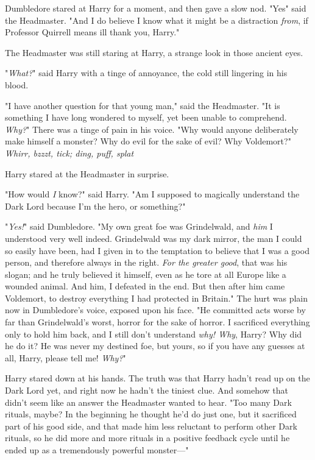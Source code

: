 Dumbledore stared at Harry for a moment, and then gave a slow nod.
"Yes{\el}" said the Headmaster. "And I do believe I know what it might be a
distraction \emph{from}, if Professor Quirrell means ill{\el} thank you,
Harry."

The Headmaster was still staring at Harry, a strange look in those ancient eyes.

"\emph{What?}" said Harry with a tinge of annoyance, the cold still lingering
in his blood.

"I have another question for that young man," said the Headmaster. "It is
something I have long wondered to myself, yet been unable to comprehend.
\emph{Why?}" There was a tinge of pain in his voice. "Why would anyone
deliberately make himself a monster? Why do evil for the sake of evil? Why
Voldemort?"
\sbreak
\emph{Whirr, bzzzt, tick; ding, puff, splat{\el}}

Harry stared at the Headmaster in surprise.

"How would \emph{I} know?" said Harry. "Am I supposed to magically understand
the Dark Lord because I'm the hero, or something?"

"\emph{Yes!}" said Dumbledore. "My own great foe was Grindelwald, and
\emph{him} I understood very well indeed. Grindelwald was my dark mirror, the
man I could so easily have been, had I given in to the temptation to believe
that I was a good person, and therefore always in the right. \emph{For the
greater good}, that was his slogan; and he truly believed it himself, even as
he tore at all Europe like a wounded animal. And him, I defeated in the end.
But then after him came Voldemort, to destroy everything I had protected in
Britain." The hurt was plain now in Dumbledore's voice, exposed upon his face.
"He committed acts worse by far than Grindelwald's worst, horror for the sake
of horror. I sacrificed everything only to hold him back, and I still don't
understand \emph{why! Why}, Harry? Why did he do it? He was never my destined
foe, but yours, so if you have any guesses at all, Harry, please tell me!
\emph{Why?}"

Harry stared down at his hands. The truth was that Harry hadn't read up on the
Dark Lord yet, and right now he hadn't the tiniest clue. And somehow that
didn't seem like an answer the Headmaster wanted to hear. "Too many Dark
rituals, maybe? In the beginning he thought he'd do just one, but it sacrificed
part of his good side, and that made him less reluctant to perform other Dark
rituals, so he did more and more rituals in a positive feedback cycle until he
ended up as a tremendously powerful monster—"

